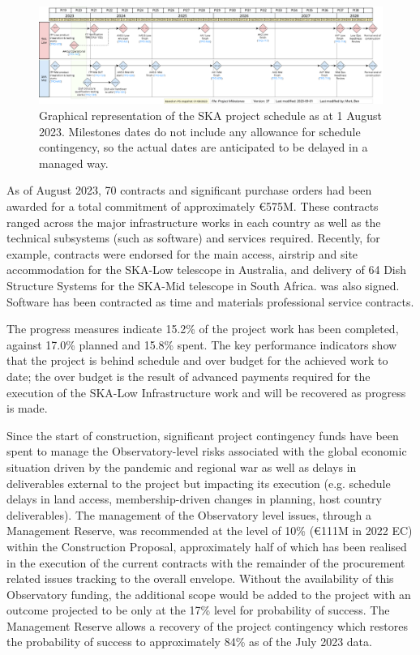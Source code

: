 \documentclass[a4paper,
               biblatex,     %
               keeplastbox,   %
               ]{jacow}
\begin{document}
 \begin{figure}[tb]
	\centering
	  \includegraphics[width=\textwidth]{FR1BCO03f2.png}
	\caption{
		Graphical representation of the SKA project schedule as at 1 August 2023. Milestones dates do not include any allowance for schedule contingency, so the actual dates are anticipated to be delayed in a managed way.
	}
	\label{fig:ska-timeline}
  \end{figure}

As of August 2023, 70 contracts and significant purchase orders had been awarded for a total commitment of approximately €575M. These contracts ranged across the major infrastructure works in each country as well as the technical subsystems (such as software) and services required. Recently, for example, contracts were endorsed for the main access, airstrip and site accommodation for the SKA-Low telescope in Australia, and delivery of 64 Dish Structure Systems for the SKA-Mid telescope in South Africa. was also signed. Software has been contracted as time and materials professional service contracts.

The progress measures indicate 15.2\% of the project work has been completed, against 17.0\% planned and 15.8\% spent.  The key performance indicators show that the project is behind schedule and over budget for the achieved work to date; the over budget is the result of advanced payments required for the execution of the SKA-Low Infrastructure work and will be recovered as progress is made.

Since the start of construction, significant project contingency funds have been spent to manage the Observatory-level risks associated with the global economic situation driven by the pandemic and regional war as well as delays in deliverables external to the project but impacting its execution (e.g. schedule delays in land access, membership-driven changes in planning, host country deliverables). The management of the Observatory level issues, through a Management Reserve, was recommended at the level of 10\% (€111M in 2022 EC) within the Construction Proposal, approximately half of which has been realised in the execution of the current contracts with the remainder of the procurement related issues tracking to the overall envelope. Without the availability of this Observatory funding, the additional scope would be added to the project with an outcome projected to be only at the 17\% level for probability of success. The Management Reserve allows a recovery of the project contingency which restores the probability of success to approximately 84\% as of the July 2023 data.
\end{document}
